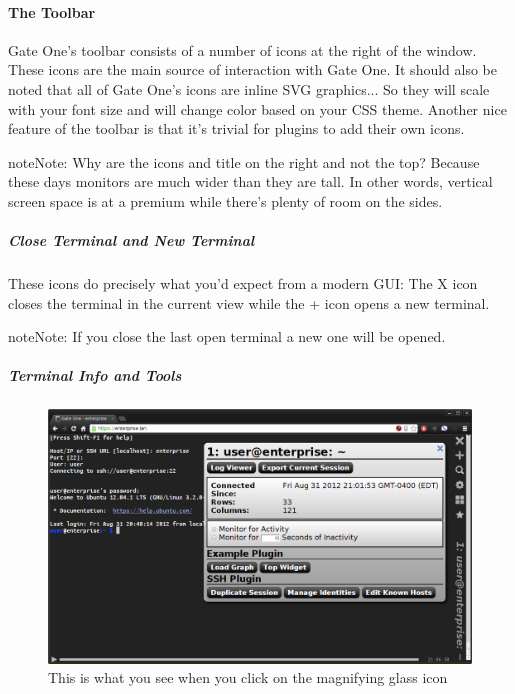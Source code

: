 \documentclass[letterpaper,10pt,openany]{sphinxmanual}
\begin{document}
\paragraph{The Toolbar}
\label{Applications/terminal/userguide:the-toolbar}
Gate One's toolbar consists of a number of icons at the right of the window.  These icons are the main source of interaction with Gate One.  It should also be noted that all of Gate One's icons are inline SVG graphics...  So they will scale with your font size and will change color based on your CSS theme.  Another nice feature of the toolbar is that it's trivial for plugins to add their own icons.

\begin{notice}{note}{Note:}
Why are the icons and title on the right and not the top?  Because these days monitors are much wider than they are tall.  In other words, vertical screen space is at a premium while there's plenty of room on the sides.
\end{notice}


\subparagraph{Close Terminal and New Terminal}
\label{Applications/terminal/userguide:close-terminal-and-new-terminal}
These icons do precisely what you'd expect from a modern GUI:  The X icon closes the terminal in the current view while the + icon opens a new terminal.

\begin{notice}{note}{Note:}
If you close the last open terminal a new one will be opened.
\end{notice}


\subparagraph{Terminal Info and Tools}
\label{Applications/terminal/userguide:terminal-info-and-tools}\begin{figure}[htbp]
\centering
\capstart

\includegraphics{gateone_infopanel.png}
\caption{This is what you see when you click on the magnifying glass icon}\end{figure}
\end{document}
